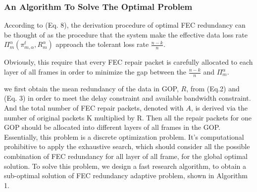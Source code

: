 \subsubsection{An Algorithm To Solve The Optimal Problem}
According to (Eq. 8), the derivation procedure of optimal FEC redundancy can be thought of as the procedure that the system make the effective data loss rate $\Pi _m^\alpha(\pi _{m,\alpha }^t, R_m^\alpha )$ approach the tolerant loss rate $\frac{{n - k}}{n}$.  

Obviously, this require that every FEC repair packet is carefully allocated to each layer of all frames in order to minimize the gap between the $\frac{{n - k}}{n}$ and $\Pi _m^\alpha$. 

we first obtain the mean redundancy of the data in GOP, $R$, from (Eq.2) and (Eq. 3) in order to meet the delay constraint and available bandwidth constraint. And the total number of FEC repair packets, denoted with $A$, is derived via the number of original packets K multiplied by R. Then all the repair packets for one GOP should be allocated into different layers of all frames in the GOP. 
Essentially, this problem is a discrete optimization problem.
It's computational prohibitive to apply the exhaustive search, which should consider all the possible combination of FEC redundancy for all layer of all frame, for the global optimal solution. 
To solve this problem, we design a fast research algorithm, to obtain a sub-optimal solution of FEC redundancy adaptive problem, shown in Algorithm 1. 

